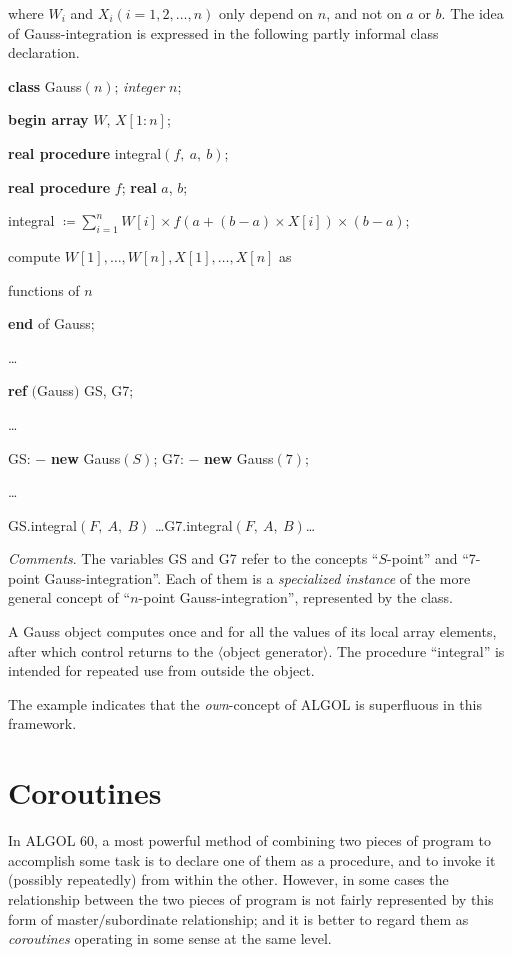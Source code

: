 \noindent
where $W_i$ and $X_i(i = 1, 2, \dots, n)$ only depend on $n$, and not on $a$ or $b$. The idea of Gauss-integration is expressed in the following partly informal class declaration.

\quad \textbf{class} Gauss$(n)$; \textit{integer} $n$;

\quad \textbf{begin array} $W$, $X[1:n]$;

\quad \quad \textbf{real procedure} integral$(f,\ a,\ b)$;

\quad \quad \textbf{real procedure} $f$; \textbf{real} $a$, $b$;

\quad \quad integral $\coloneq \sum_{i=1}^n W[i] \times f(a + (b - a)\times X[i])\times (b- a)$;

\quad \quad compute $W[1], \dots, W[n], X[1], \dots, X[n]$ as

\quad \quad functions of $n$

\quad \textbf{end} of Gauss;

\quad \dots

\quad \textbf{ref} $($Gauss$)$ GS, G7;

\quad \dots

\quad GS: $-$ \textbf{new} Gauss$(S)$; G7: $-$ \textbf{new} Gauss$(7)$;

\quad \dots

\quad GS.integral$(F,\ A,\ B)$ \dots G7.integral$(F,\ A,\ B)$\dots

\noindent
\textit{Comments}. The variables GS and G7 refer to the concepts ``$S$-point'' and ``7-point Gauss-integration''. Each of them is a \textit{specialized instance} of the
more general concept of ``$n$-point Gauss-integration'', represented by the class.

A Gauss object computes once and for all the values of its local array elements, after which control returns to the $\langle$object generator$\rangle$. The procedure ``integral'' is intended for repeated use from outside the object.

The example indicates that the \textit{own}-concept of ALGOL is superfluous in this framework.

\section{Coroutines}

In ALGOL 60, a most powerful method of combining two pieces of program to accomplish some task is to declare one of them as a procedure, and to invoke it (possibly repeatedly) from within the other. However, in some cases the relationship between the two pieces of program is not fairly represented by this form of master$/$subordinate relationship; and it is better to regard them as \textit{coroutines} operating in some sense at the same level.

